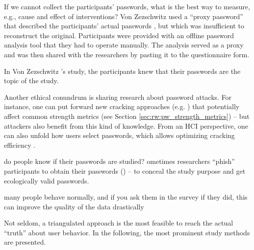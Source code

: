 If we cannot collect the participants' passwords, what is the best way to measure, e.g., cause and effect of interventions? Von Zezschwitz \etal used a ``proxy password'' that described the participants' actual passwords \cite{VonZezschwitz2013SurvivalShortest}, but which was insufficient to reconstruct the original. Participants were provided with an offline password analysis tool that they had to operate manually. The analysis served as a proxy and was then shared with the researchers by pasting it to the questionnaire form. 

In Von Zezschwitz \etal's study, the participants knew that their passwords are the topic of the study.


Another ethical conundrum is sharing research about password attacks. For instance, one can put forward new cracking approaches (e.g. \cite{Marechal2008AdvancesPWCracking, Narayanan2005FastDictionaryAttacks, Schmidt2013Pitfalls, Weir2009PCFG}) that potentially affect common strength metrics (see Section \ref{sec:rw:pw_strength_metrics}) -- but attackers also benefit from this kind of knowledge. From an HCI perspective, one can also unfold how users select passwords, which allows optimizing cracking efficiency \cite{Weir2010MetricsPolicies, Wheeler2016zxcvbn}. 

do people know if their passwords are studied?
ometimes researchers ``phish'' participants to obtain their passwords (\cite{Egelman2013DoesMyPasswordGoUpToEleven, Haque2014Hierarchy, Mazurek2013Measuring}) -- to conceal the study purpose and get ecologically valid passwords. 


 many people behave normally, and if you ask them in the survey if they did, this can improve the quality of the data drastically \cite{Fahl2013EcologicalValidityPasswordStudy}


Not seldom, a triangulated approach is the most feasible to reach the actual ``truth'' about user behavior. In the following, the most prominent study methods are presented. 


%
%
%

